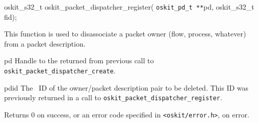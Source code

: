 \begin{apisyn}

	\funcproto oskit_s32_t oskit_packet_dispatcher_register(
	{\tt oskit_pd_t **}pd, 
	oskit_s32_t fid);
\end{apisyn}
\begin{apidesc}
	This function is used to disassociate a packet owner (flow,
	process, whatever) from a packet description. 
\end{apidesc}
\begin{apiparm}
	\item[pd]
		Handle to the \pd returned from previous
		call to {\tt oskit_packet_dispatcher_create}. 
	\item[pdid]
		The \pd\ ID of the owner/packet description pair
		to be deleted. This ID was previously returned
		in a call to {\tt oskit_packet_dispatcher_register}.
\end{apiparm}
\begin{apiret}
	Returns 0 on success, or an error code specified in
	{\tt <oskit/error.h>}, on error.
\end{apiret}




